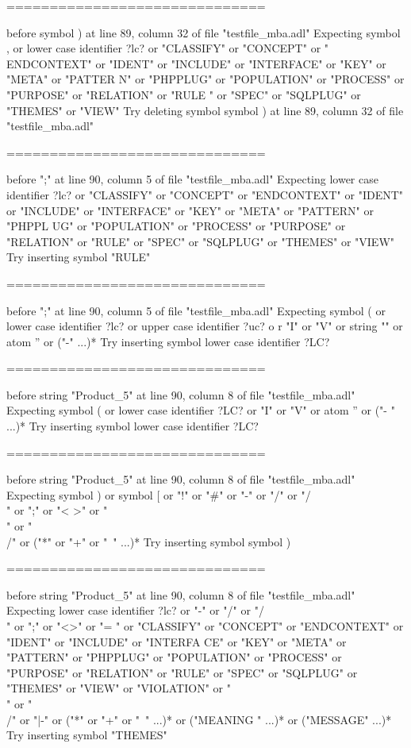 \begin{description}
\begin{haskell}
==============================

before symbol ) at line 89, column 32 of file "testfile_mba.adl"
Expecting symbol , or lower case identifier ?lc? or "CLASSIFY" or "CONCEPT" or "
ENDCONTEXT" or "IDENT" or "INCLUDE" or "INTERFACE" or "KEY" or "META" or "PATTER
N" or "PHPPLUG" or "POPULATION" or "PROCESS" or "PURPOSE" or "RELATION" or "RULE
" or "SPEC" or "SQLPLUG" or "THEMES" or "VIEW"
Try deleting symbol symbol ) at line 89, column 32 of file "testfile_mba.adl"

==============================

before ";" at line 90, column 5 of file "testfile_mba.adl"
Expecting lower case identifier ?lc? or "CLASSIFY" or "CONCEPT" or "ENDCONTEXT"
or "IDENT" or "INCLUDE" or "INTERFACE" or "KEY" or "META" or "PATTERN" or "PHPPL
UG" or "POPULATION" or "PROCESS" or "PURPOSE" or "RELATION" or "RULE" or "SPEC"
or "SQLPLUG" or "THEMES" or "VIEW"
Try inserting symbol "RULE"

==============================

before ";" at line 90, column 5 of file "testfile_mba.adl"
Expecting symbol ( or lower case identifier ?lc? or upper case identifier ?uc? o
r "I" or "V" or string "" or atom '' or ("-" ...)*
Try inserting symbol lower case identifier ?LC?

==============================

before string "Product_5" at line 90, column 8 of file "testfile_mba.adl"
Expecting symbol ( or lower case identifier ?LC? or "I" or "V" or atom '' or ("-
" ...)*
Try inserting symbol lower case identifier ?LC?

==============================

before string "Product_5" at line 90, column 8 of file "testfile_mba.adl"
Expecting symbol ) or symbol [ or "!" or "#" or "-" or "/" or "/\\" or ";" or "<
>" or "\\" or "\\/" or ("*" or "+" or "~" ...)*
Try inserting symbol symbol )

==============================

before string "Product_5" at line 90, column 8 of file "testfile_mba.adl"
Expecting lower case identifier ?lc? or "-" or "/" or "/\\" or ";" or "<>" or "=
" or "CLASSIFY" or "CONCEPT" or "ENDCONTEXT" or "IDENT" or "INCLUDE" or "INTERFA
CE" or "KEY" or "META" or "PATTERN" or "PHPPLUG" or "POPULATION" or "PROCESS" or
 "PURPOSE" or "RELATION" or "RULE" or "SPEC" or "SQLPLUG" or "THEMES" or "VIEW"
or "VIOLATION" or "\\" or "\\/" or "|-" or ("*" or "+" or "~" ...)* or ("MEANING
" ...)* or ("MESSAGE" ...)*
Try inserting symbol "THEMES"


\end{haskell}
\end{description}
